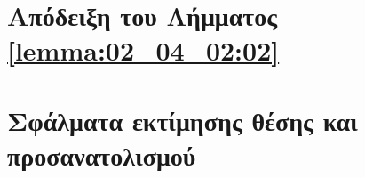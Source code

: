 \section{Απόδειξη του Λήμματος \ref{lemma:02_04_02:02}}
  \label{appendix:04:lemma_01_proof}
  

\section{Σφάλματα εκτίμησης θέσης και προσανατολισμού}
  \label{appendix:04:pos_orient_errors}
  
